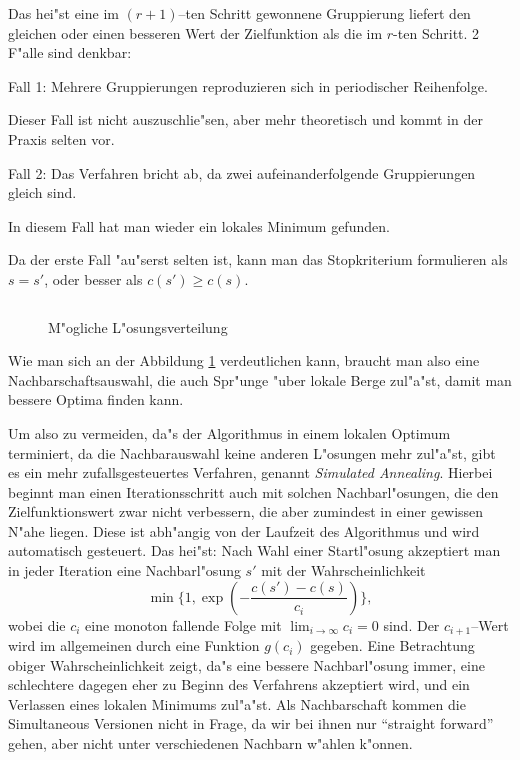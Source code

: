 Das hei"st eine im $(r+1)$--ten Schritt gewonnene Gruppierung liefert den
gleichen oder einen besseren Wert der Zielfunktion als die im $r$-ten
Schritt. 2 F"alle sind denkbar:

Fall 1: Mehrere Gruppierungen reproduzieren sich in periodischer Reihenfolge.

Dieser Fall ist nicht auszuschlie"sen, aber mehr theoretisch und kommt in 
der Praxis selten vor.

Fall 2: Das Verfahren bricht ab, da zwei aufeinanderfolgende Gruppierungen
gleich sind.

In diesem Fall hat man wieder ein lokales Minimum gefunden.

Da der erste Fall "au"serst selten ist, kann man das Stopkriterium 
formulieren als $s = s'$, oder besser als $c(s') \geq c(s)$.

\begin{figure}[htbp]
\[  \]
\caption{M"ogliche L"osungsverteilung \label{bergundtal}}
\end{figure}

Wie man sich an der Abbildung \ref{bergundtal} verdeutlichen kann, 
braucht man also eine
Nachbarschaftsauswahl, die auch Spr"unge "uber lokale Berge zul"a"st,
damit man bessere Optima finden kann.

Um also zu vermeiden, da"s der Algorithmus in einem lokalen Optimum terminiert, 
da die Nachbarauswahl keine anderen L"osungen mehr zul"a"st, gibt es
ein mehr zufallsgesteuertes Verfahren, genannt {\em Simulated
Annealing}.
Hierbei beginnt man einen Iterationsschritt 
auch mit solchen Nachbarl"osungen, die den 
Zielfunktionswert zwar nicht verbessern, die aber zumindest in einer
gewissen N"ahe liegen. Diese ist abh"angig von der Laufzeit des
Algorithmus und wird automatisch gesteuert. Das hei"st:
Nach Wahl einer Startl"osung akzeptiert man in jeder Iteration eine
Nachbarl"osung $s'$ mit der Wahrscheinlichkeit
\[
	\min \{1, \exp(-\frac{c(s') - c(s)}{c_i}) \},
\]
wobei die $c_i$ eine monoton fallende Folge mit $\lim_{i \to \infty}
c_i = 0$ sind.
Der $c_{i+1}$--Wert wird im allgemeinen durch eine Funktion $g(c_i)$ 
gegeben.
Eine Betrachtung obiger Wahrscheinlichkeit zeigt, da"s eine bessere
Nachbarl"osung immer, eine schlechtere dagegen eher zu Beginn des 
Verfahrens akzeptiert wird, und ein Verlassen eines lokalen Minimums
zul"a"st.
Als Nachbarschaft kommen die Simul\-taneous Versionen nicht in 
Frage, da wir bei ihnen nur "`straight forward"' gehen, aber
nicht unter verschiedenen Nachbarn w"ahlen k"onnen.

